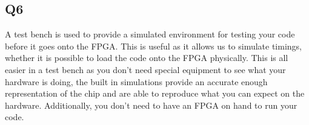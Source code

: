 \documentclass[a4paper, 12pt]{article}
\begin{document}
		\subsection{Q6}
			A test bench is used to provide a simulated environment for testing your code before it goes onto the FPGA. This is useful as it allows us to simulate timings, whether it is possible to load the code onto the FPGA physically. This is all easier in a test bench as you don't need special equipment to see what your hardware is doing, the built in simulations provide an accurate enough representation of the chip and are able to reproduce what you can expect on the hardware. Additionally, you don't need to have an FPGA on hand to run your code.




\end{document}

